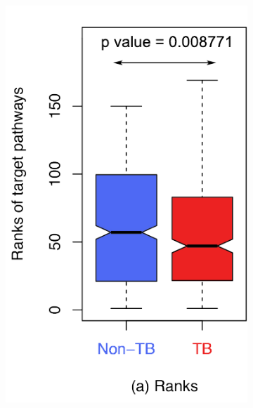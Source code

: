 \begin{figure}
\centering
        \begin{subfigure}[b]{0.3\textwidth}
        \includegraphics[width=1\linewidth]{../Figures/Ranks_NonTBvsTB}
                \label{rank}
        \end{subfigure}\hspace{10mm}
        \begin{subfigure}[b]{0.3\textwidth}

\end{subfigure}
\end{figure}
